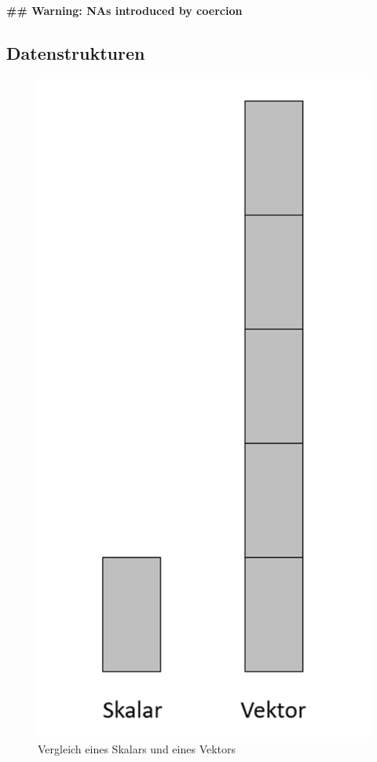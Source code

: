 \documentclass[
]{article}
\begin{document}
\textbf{\#\# Warning: NAs introduced by coercion}

\hypertarget{datenstrukturen}{%
\subsection{Datenstrukturen}\label{datenstrukturen}}

\begin{figure}

{\centering \includegraphics[width=4.88in]{images/015} 

}

\caption{Vergleich eines Skalars und eines Vektors}\label{fig:unnamed-chunk-50}
\end{figure}
\end{document}
